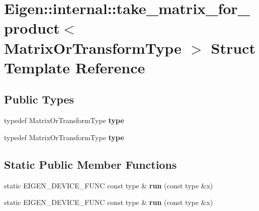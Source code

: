 \hypertarget{struct_eigen_1_1internal_1_1take__matrix__for__product}{}\section{Eigen\+:\+:internal\+:\+:take\+\_\+matrix\+\_\+for\+\_\+product$<$ Matrix\+Or\+Transform\+Type $>$ Struct Template Reference}
\label{struct_eigen_1_1internal_1_1take__matrix__for__product}
\subsection*{Public Types}
\begin{DoxyCompactItemize}
\item 
\mbox{\label{struct_eigen_1_1internal_1_1take__matrix__for__product_a9f9aed864d09934e140293bcaa9d307b}} 
typedef Matrix\+Or\+Transform\+Type {\bfseries type}
\item 
\mbox{\label{struct_eigen_1_1internal_1_1take__matrix__for__product_a9f9aed864d09934e140293bcaa9d307b}} 
typedef Matrix\+Or\+Transform\+Type {\bfseries type}
\end{DoxyCompactItemize}
\subsection*{Static Public Member Functions}
\begin{DoxyCompactItemize}
\item 
\mbox{\label{struct_eigen_1_1internal_1_1take__matrix__for__product_a7a90e0535b7ae9c428ecff0b5aec435e}} 
static E\+I\+G\+E\+N\+\_\+\+D\+E\+V\+I\+C\+E\+\_\+\+F\+U\+NC const type \& {\bfseries run} (const type \&x)
\item 
\mbox{\label{struct_eigen_1_1internal_1_1take__matrix__for__product_a7a90e0535b7ae9c428ecff0b5aec435e}} 
static E\+I\+G\+E\+N\+\_\+\+D\+E\+V\+I\+C\+E\+\_\+\+F\+U\+NC const type \& {\bfseries run} (const type \&x)
\end{DoxyCompactItemize}


